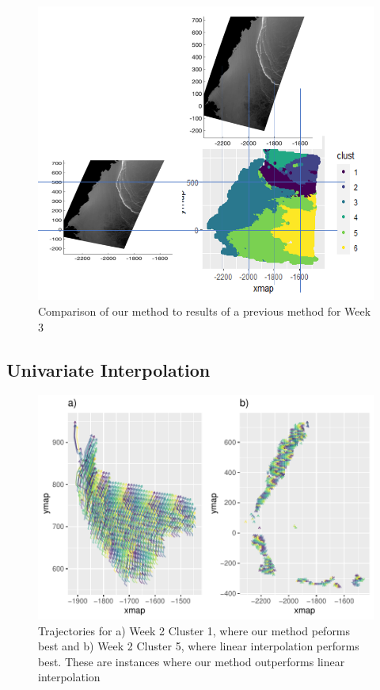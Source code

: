 \documentclass[12pt]{article}
\begin{document}
\begin{figure}[tbp]

{\centering \includegraphics[width=1\linewidth,]{images/week-comp} 

}

\caption{Comparison of our method to results of a previous method for Week 3}\label{fig:week-comp}
\end{figure}

\hypertarget{univariate-interpolation-1}{%
\subsection{Univariate Interpolation}\label{univariate-interpolation-1}}

\begin{figure}[tbp]

{\centering \includegraphics[width=\linewidth,]{spatio-temporal-model-arctic-sea-ice_files/figure-latex/int-best-plots-1} 

}

\caption{Trajectories for a) Week 2 Cluster 1, where our method peforms best and b) Week 2 Cluster 5, where linear interpolation performs best. These are instances where our method outperforms linear interpolation}\label{fig:int-best-plots}
\end{figure}
\end{document}
